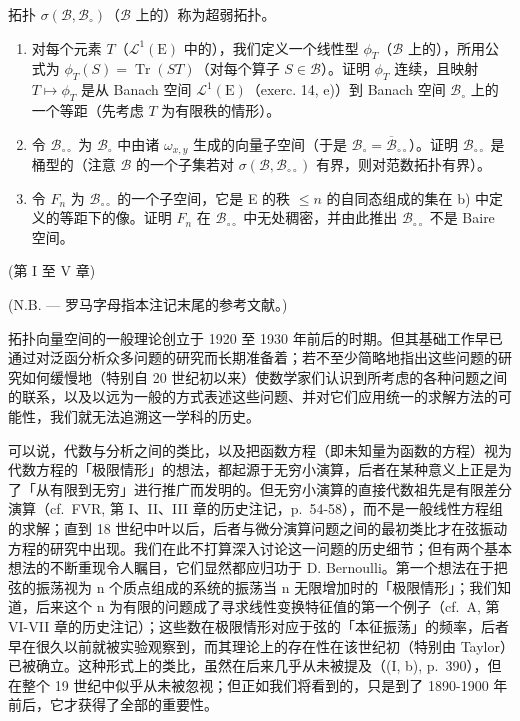 拓扑 \(\sigma (\mathcal{B},\mathcal{B}_{\circ})\)（\(\mathcal{B}\) 上的）称为超弱拓扑。

\begin{enumerate}
\def\labelenumi{\alph{enumi})}
\setcounter{enumi}{1}
\item
  对每个元素 \(T\)（\(\mathcal{L}^1(\mathrm{E})\) 中的），我们定义一个线性型 \(\phi_T\)（\(\mathcal{B}\) 上的），所用公式为 \(\phi_T(S) = \operatorname{Tr}(ST)\)（对每个算子 \(S \in \mathcal{B}\)）。证明 \(\phi_T\) 连续，且映射 \(T \mapsto \phi_T\) 是从 Banach 空间 \(\mathcal{L}^1(\mathrm{E})\)（exerc. 14, e)）到 Banach 空间 \(\mathcal{B}_{\circ}\) 上的一个等距（先考虑 \(T\) 为有限秩的情形）。
\item
  令 \(\mathcal{B}_{\circ \circ}\) 为 \(\mathcal{B}_{\circ}\) 中由诸 \(\omega_{x,y}\) 生成的向量子空间（于是 \(\mathcal{B}_{\circ} = \overline{\mathcal{B}}_{\circ \circ} \)）。证明 \(\mathcal{B}_{\circ \circ}\) 是桶型的（注意 \(\mathcal{B}\) 的一个子集若对 \(\sigma (\mathcal{B},\mathcal{B}_{\circ \circ})\) 有界，则对范数拓扑有界）。
\item
  令 \(F_{n}\) 为 \(\mathcal{B}_{\circ \circ}\) 的一个子空间，它是 E 的秩 \(\leqslant n\) 的自同态组成的集在 b) 中定义的等距下的像。证明 \(F_{n}\) 在 \(\mathcal{B}_{\circ \circ}\) 中无处稠密，并由此推出 \(\mathcal{B}_{\circ \circ}\) 不是 Baire 空间。
\end{enumerate}

\backmatter
{}

(第 I 至 V 章)

(N.B. --- 罗马字母指本注记末尾的参考文献。)

拓扑向量空间的一般理论创立于 1920 至 1930 年前后的时期。但其基础工作早已通过对泛函分析众多问题的研究而长期准备着；若不至少简略地指出这些问题的研究如何缓慢地（特别自 20 世纪初以来）使数学家们认识到所考虑的各种问题之间的联系，以及以远为一般的方式表述这些问题、并对它们应用统一的求解方法的可能性，我们就无法追溯这一学科的历史。

可以说，代数与分析之间的类比，以及把函数方程（即未知量为函数的方程）视为代数方程的「极限情形」的想法，都起源于无穷小演算，后者在某种意义上正是为了「从有限到无穷」进行推广而发明的。但无穷小演算的直接代数祖先是有限差分演算（cf.~FVR, 第 I、II、III 章的历史注记，p.~54-58），而不是一般线性方程组的求解；直到 18 世纪中叶以后，后者与微分演算问题之间的最初类比才在弦振动方程的研究中出现。我们在此不打算深入讨论这一问题的历史细节；但有两个基本想法的不断重现令人瞩目，它们显然都应归功于 D. Bernoulli。第一个想法在于把弦的振荡视为 n 个质点组成的系统的振荡当 n 无限增加时的「极限情形」；我们知道，后来这个 n 为有限的问题成了寻求线性变换特征值的第一个例子（cf.~A, 第 VI-VII 章的历史注记）；这些数在极限情形对应于弦的「本征振荡」的频率，后者早在很久以前就被实验观察到，而其理论上的存在性在该世纪初（特别由 Taylor）已被确立。这种形式上的类比，虽然在后来几乎从未被提及（(I, b), p.~390），但在整个 19 世纪中似乎从未被忽视；但正如我们将看到的，只是到了 1890-1900 年前后，它才获得了全部的重要性。


